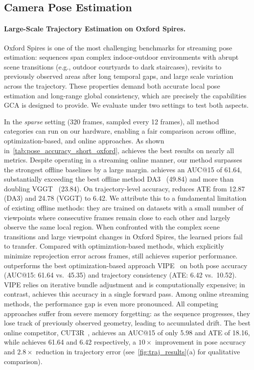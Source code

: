 \subsection{Camera Pose Estimation}

\paragraph{Large-Scale Trajectory Estimation on Oxford Spires.}
Oxford Spires is one of the most challenging benchmarks for streaming
pose estimation: sequences span complex indoor-outdoor environments
with abrupt scene transitions (e.g., outdoor courtyards to dark
staircases), revisits to previously observed areas after long temporal
gaps, and large scale variation across the trajectory.
These properties demand both accurate local pose estimation and
long-range global consistency, which are precisely the capabilities
GCA is designed to provide.
We evaluate under two settings to test both aspects.

In the \textit{sparse} setting (320 frames, sampled every 12 frames),
all method categories can run on our hardware, enabling a fair
comparison across offline, optimization-based, and online approaches.
As shown in~\cref{tab:pose_accuracy_short_oxford}, \method
achieves the best results on nearly all metrics.
Despite operating in a streaming online manner, our method surpasses
the strongest offline baselines by a large margin.
\method achieves an AUC@15 of 61.64, substantially exceeding the
best offline method DA3~\cite{depthanything3} (49.84) and more than
doubling VGGT~\cite{wang2025vggt} (23.84).
On trajectory-level accuracy, \method reduces ATE from 12.87
(DA3) and 24.78 (VGGT) to 6.42.
We attribute this to a fundamental limitation of existing offline
methods: they are trained on datasets with a small number of
viewpoints where consecutive frames remain close to each other and
largely observe the same local region.
When confronted with the complex scene transitions and large
viewpoint changes in Oxford Spires, the learned priors fail to
transfer.
Compared with optimization-based methods, which explicitly minimize
reprojection error across frames, \method still achieves superior
performance.
\method outperforms the best optimization-based approach
VIPE~\cite{huang2025vipe} on both pose accuracy
(AUC@15: 61.64 vs.\ 45.35) and trajectory consistency
(ATE: 6.42 vs.\ 10.52).
VIPE relies on iterative bundle adjustment and is computationally
expensive; in contrast, \method achieves this accuracy in a single
forward pass.
Among online streaming methods, the performance gap is even more
pronounced.
All competing approaches suffer from severe memory forgetting: as
the sequence progresses, they lose track of previously observed
geometry, leading to accumulated drift.
The best online competitor, CUT3R~\cite{cut3r}, achieves an AUC@15
of only 5.98 and ATE of 18.16, while \method achieves 61.64 and
6.42 respectively, a $10\times$ improvement in pose accuracy and
$2.8\times$ reduction in trajectory error
(see~\cref{fig:traj_results}(a) for qualitative comparison).

